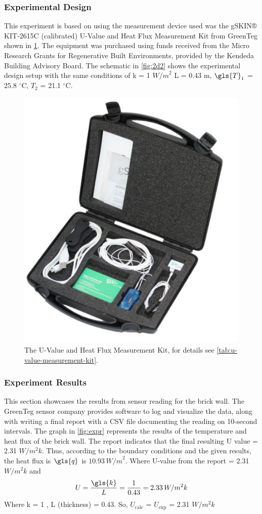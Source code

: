 



 
\subsubsection{Experimental Design}
 This experiment is based on using the measurement device used was the gSKIN® KIT-2615C (calibrated) U-Value and Heat Flux Measurement Kit from GreenTeg  \cite{greenteg} shown in \ref{fig:toolkit}. The equipment was purchased using funds received from the Micro Research Grants for Regenerative Built Environments, provided by the Kendeda Building Advisory Board\cite{kendeda}.
 The schematic in \cref{fig:2d2} shows the experimental design setup with the same conditions of k  = 1 ${W/m}^2$ 
\gls{L}  = 0.43 m,
$\gls{T}_1$ = 25.8 $^\circ \text{C}$, 
$T_2$  = 21.1  $^\circ \text{C}$.

\begin{figure}[tbh]
     \centering
    \includegraphics[width=0.5\linewidth]{Figures/greenteg.png}
     \caption[U-value measurement Kit]{The U-Value and Heat Flux Measurement Kit, for details see \cref{tab:u-value-measurement-kit}.}
   \label{fig:toolkit}
 \end{figure}






\subsubsection{Experiment Results}
This section showcases the results from sensor reading for the brick wall. The GreenTeg sensor company provides software to log and visualize the data, along with writing a final report with a CSV file documenting the reading on 10-second intervals. The graph in \ref{fig:expr} represents the results of the temperature and heat flux of the brick wall. 
The report indicates that the final resulting U value = 2.31 ${W/m^2k}$. Thus, according to the boundary conditions and the given results, the heat flux is \( \gls{q} \) is \( 10.93\, {W/m}^2 \). 
Where U-value from the report = 2.31\, ${W/m^2k}$ and 
\begin{equation}
    U = \frac{\gls{k}}{L}
      = \frac{1}{0.43} = 2.33\,  {W/m^2k}
\end{equation}
Where k = 1 , L (thickness) = 0.43. So, \(U_{\text{calc}}\) = \(U_{\text{exp}}\) = 2.31 ${W/m^2k}$ 

